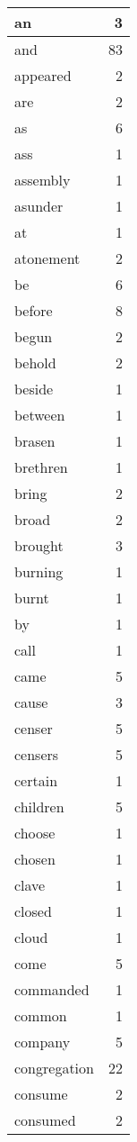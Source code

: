 \begin{center}
\begin{longtable}{l|r}
an & 3 \\ \hline
and & 83 \\ \hline
appeared & 2 \\ \hline
are & 2 \\ \hline
as & 6 \\ \hline
ass & 1 \\ \hline
assembly & 1 \\ \hline
asunder & 1 \\ \hline
at & 1 \\ \hline
atonement & 2 \\ \hline
be & 6 \\ \hline
before & 8 \\ \hline
begun & 2 \\ \hline
behold & 2 \\ \hline
beside & 1 \\ \hline
between & 1 \\ \hline
brasen & 1 \\ \hline
brethren & 1 \\ \hline
bring & 2 \\ \hline
broad & 2 \\ \hline
brought & 3 \\ \hline
burning & 1 \\ \hline
burnt & 1 \\ \hline
by & 1 \\ \hline
call & 1 \\ \hline
came & 5 \\ \hline
cause & 3 \\ \hline
censer & 5 \\ \hline
censers & 5 \\ \hline
certain & 1 \\ \hline
children & 5 \\ \hline
choose & 1 \\ \hline
chosen & 1 \\ \hline
clave & 1 \\ \hline
closed & 1 \\ \hline
cloud & 1 \\ \hline
come & 5 \\ \hline
commanded & 1 \\ \hline
common & 1 \\ \hline
company & 5 \\ \hline
congregation & 22 \\ \hline
consume & 2 \\ \hline
consumed & 2 \\ \hline

\end{longtable}
\end{center}
